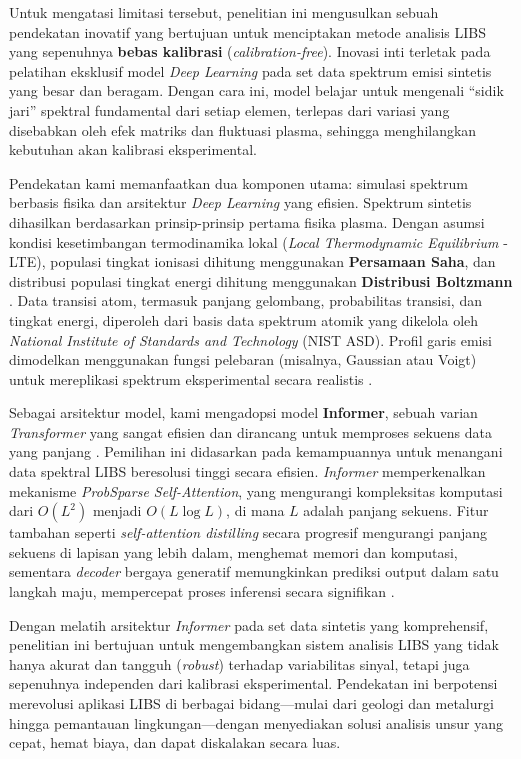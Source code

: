 Untuk mengatasi limitasi tersebut, penelitian ini mengusulkan sebuah pendekatan inovatif yang bertujuan untuk menciptakan metode analisis LIBS yang sepenuhnya \textbf{bebas kalibrasi} (\textit{calibration-free}). Inovasi inti terletak pada pelatihan eksklusif model \textit{Deep Learning} pada set data spektrum emisi sintetis yang besar dan beragam. Dengan cara ini, model belajar untuk mengenali ``sidik jari'' spektral fundamental dari setiap elemen, terlepas dari variasi yang disebabkan oleh efek matriks dan fluktuasi plasma, sehingga menghilangkan kebutuhan akan kalibrasi eksperimental.

Pendekatan kami memanfaatkan dua komponen utama: simulasi spektrum berbasis fisika dan arsitektur \textit{Deep Learning} yang efisien. Spektrum sintetis dihasilkan berdasarkan prinsip-prinsip pertama fisika plasma. Dengan asumsi kondisi kesetimbangan termodinamika lokal (\textit{Local Thermodynamic Equilibrium} - LTE), populasi tingkat ionisasi dihitung menggunakan \textbf{Persamaan Saha}, dan distribusi populasi tingkat energi dihitung menggunakan \textbf{Distribusi Boltzmann} \parencite{Chandrasekhar1939, Panne2024}. Data transisi atom, termasuk panjang gelombang, probabilitas transisi, dan tingkat energi, diperoleh dari basis data spektrum atomik yang dikelola oleh \textit{National Institute of Standards and Technology} (NIST ASD). Profil garis emisi dimodelkan menggunakan fungsi pelebaran (misalnya, Gaussian atau Voigt) untuk mereplikasi spektrum eksperimental secara realistis \parencite{Miziolek2006}.

Sebagai arsitektur model, kami mengadopsi model \textbf{Informer}, sebuah varian \textit{Transformer} yang sangat efisien dan dirancang untuk memproses sekuens data yang panjang \parencite{Zhou2021}. Pemilihan ini didasarkan pada kemampuannya untuk menangani data spektral LIBS beresolusi tinggi secara efisien. \textit{Informer} memperkenalkan mekanisme \textit{ProbSparse Self-Attention}, yang mengurangi kompleksitas komputasi dari $O(L^2)$ menjadi $O(L \log L)$, di mana $L$ adalah panjang sekuens. Fitur tambahan seperti \textit{self-attention distilling} secara progresif mengurangi panjang sekuens di lapisan yang lebih dalam, menghemat memori dan komputasi, sementara \textit{decoder} bergaya generatif memungkinkan prediksi output dalam satu langkah maju, mempercepat proses inferensi secara signifikan \parencite{Zhou2021}.

Dengan melatih arsitektur \textit{Informer} pada set data sintetis yang komprehensif, penelitian ini bertujuan untuk mengembangkan sistem analisis LIBS yang tidak hanya akurat dan tangguh (\textit{robust}) terhadap variabilitas sinyal, tetapi juga sepenuhnya independen dari kalibrasi eksperimental. Pendekatan ini berpotensi merevolusi aplikasi LIBS di berbagai bidang—mulai dari geologi dan metalurgi hingga pemantauan lingkungan—dengan menyediakan solusi analisis unsur yang cepat, hemat biaya, dan dapat diskalakan secara luas.



